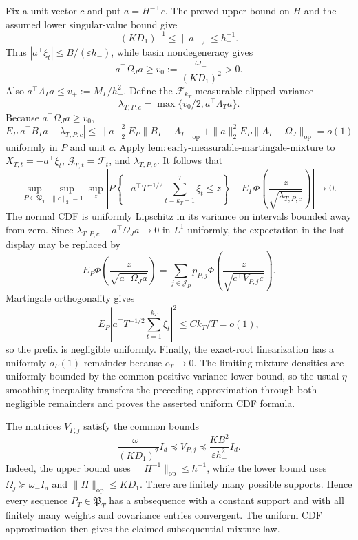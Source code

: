 Fix a unit vector \(c\) and put \(a=H^{-\top}c\). The proved upper bound on \(H\) and the assumed lower singular-value bound give
\[
 (KD_1)^{-1}\le\|a\|_2\le h_-^{-1}.
\]
Thus \(|a^\top\xi_t|\le B/(\varepsilon h_-)\), while basin nondegeneracy gives
\[
 a^\top\Omega_Ja\ge v_0:=\frac{\omega_-}{(KD_1)^2}>0.
\]
Also \(a^\top\Lambda_Ta\le v_+:=M_\Gamma/h_-^2\). Define the \(\mathcal F_{k_T}\)-measurable clipped variance
\[
 \lambda_{T,P,c}=\max\{v_0/2,a^\top\Lambda_Ta\}.
\]
Because \(a^\top\Omega_Ja\ge v_0\),
\[
 E_P|a^\top B_Ta-\lambda_{T,P,c}|
 \le \|a\|_2^2E_P\|B_T-\Lambda_T\|_{\mathrm{op}}
 +\|a\|_2^2E_P\|\Lambda_T-\Omega_J\|_{\mathrm{op}}=o(1)
\]
uniformly in \(P\) and unit \(c\). Apply \(\mathrm{lem:early\text{-}measurable\text{-}martingale\text{-}mixture}\) to \(X_{T,t}=-a^\top\xi_t\), \(\mathcal G_{T,t}=\mathcal F_t\), and \(\lambda_{T,P,c}\). It follows that
\[
 \sup_{P\in\mathfrak P_T}\sup_{\|c\|_2=1}\sup_z
 \left|P\left\{-a^\top T^{-1/2}\sum_{t=k_T+1}^T\xi_t\le z\right\}
 -E_P\Phi\left(\frac z{\sqrt{\lambda_{T,P,c}}}\right)\right|\longrightarrow0.
\]
The normal CDF is uniformly Lipschitz in its variance on intervals bounded away from zero. Since \(\lambda_{T,P,c}-a^\top\Omega_Ja\to0\) in \(L^1\) uniformly, the expectation in the last display may be replaced by
\[
 E_P\Phi\left(\frac z{\sqrt{a^\top\Omega_Ja}}\right)
 =\sum_{j\in\mathcal J_P}p_{P,j}\Phi\left(\frac z{\sqrt{c^\top V_{P,j}c}}\right).
\]
Martingale orthogonality gives
\[
 E_P\left|a^\top T^{-1/2}\sum_{t=1}^{k_T}\xi_t\right|^2
 \le Ck_T/T=o(1),
\]
so the prefix is negligible uniformly. Finally, the exact-root linearization has a uniformly \(o_P(1)\) remainder because \(e_T\to0\). The limiting mixture densities are uniformly bounded by the common positive variance lower bound, so the usual \(\eta\)-smoothing inequality transfers the preceding approximation through both negligible remainders and proves the asserted uniform CDF formula.

The matrices \(V_{P,j}\) satisfy the common bounds
\[
 \frac{\omega_-}{(KD_1)^2}I_d\preceq V_{P,j}
 \preceq\frac{KB^2}{\varepsilon h_-^2}I_d.
\]
Indeed, the upper bound uses \(\|H^{-1}\|_{\mathrm{op}}\le h_-^{-1}\), while the lower bound uses \(\Omega_j\succeq\omega_-I_d\) and \(\|H\|_{\mathrm{op}}\le KD_1\). There are finitely many possible supports. Hence every sequence \(P_T\in\mathfrak P_T\) has a subsequence with a constant support and with all finitely many weights and covariance entries convergent. The uniform CDF approximation then gives the claimed subsequential mixture law.

